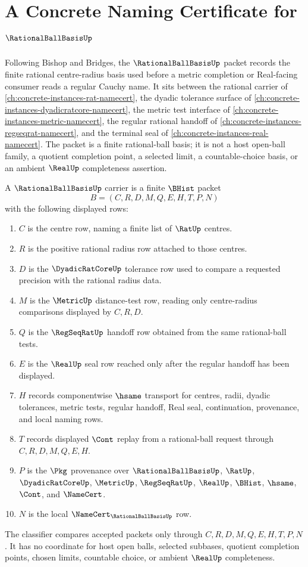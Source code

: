 \chapter{A Concrete Naming Certificate for $\RationalBallBasisUp$}
\label{ch:concrete-instances-rational-ball-basis-namecert}

Following Bishop and Bridges, the $\RationalBallBasisUp$ packet records the finite rational centre-radius basis used before a metric completion or Real-facing consumer reads a regular Cauchy name. It sits between the rational carrier of \autoref{ch:concrete-instances-rat-namecert}, the dyadic tolerance surface of \autoref{ch:concrete-instances-dyadicratcore-namecert}, the metric test interface of \autoref{ch:concrete-instances-metric-namecert}, the regular rational handoff of \autoref{ch:concrete-instances-regseqrat-namecert}, and the terminal seal of \autoref{ch:concrete-instances-real-namecert}. The packet is a finite rational-ball basis; it is not a host open-ball family, a quotient completion point, a selected limit, a countable-choice basis, or an ambient $\RealUp$ completeness assertion.

\begin{definition}
\label{def:rational-ball-basis-carrier}
A $\RationalBallBasisUp$ carrier is a finite $\BHist$ packet
$$
B=(C,R,D,M,Q,E,H,T,P,N)
$$
with the following displayed rows:
\begin{enumerate}
\item $C$ is the centre row, naming a finite list of $\RatUp$ centres.
\item $R$ is the positive rational radius row attached to those centres.
\item $D$ is the $\DyadicRatCoreUp$ tolerance row used to compare a requested precision with the rational radius data.
\item $M$ is the $\MetricUp$ distance-test row, reading only centre-radius comparisons displayed by $C,R,D$.
\item $Q$ is the $\RegSeqRatUp$ handoff row obtained from the same rational-ball tests.
\item $E$ is the $\RealUp$ seal row reached only after the regular handoff has been displayed.
\item $H$ records componentwise $\hsame$ transport for centres, radii, dyadic tolerances, metric tests, regular handoff, Real seal, continuation, provenance, and local naming rows.
\item $T$ records displayed $\Cont$ replay from a rational-ball request through $C,R,D,M,Q,E,H$.
\item $P$ is the $\Pkg$ provenance over $\RationalBallBasisUp$, $\RatUp$, $\DyadicRatCoreUp$, $\MetricUp$, $\RegSeqRatUp$, $\RealUp$, $\BHist$, $\hsame$, $\Cont$, and $\NameCert$.
\item $N$ is the local $\NameCert_{\RationalBallBasisUp}$ row.
\end{enumerate}
The classifier compares accepted packets only through $C,R,D,M,Q,E,H,T,P,N$. It has no coordinate for host open balls, selected subbases, quotient completion points, chosen limits, countable choice, or ambient $\RealUp$ completeness.
\end{definition}

